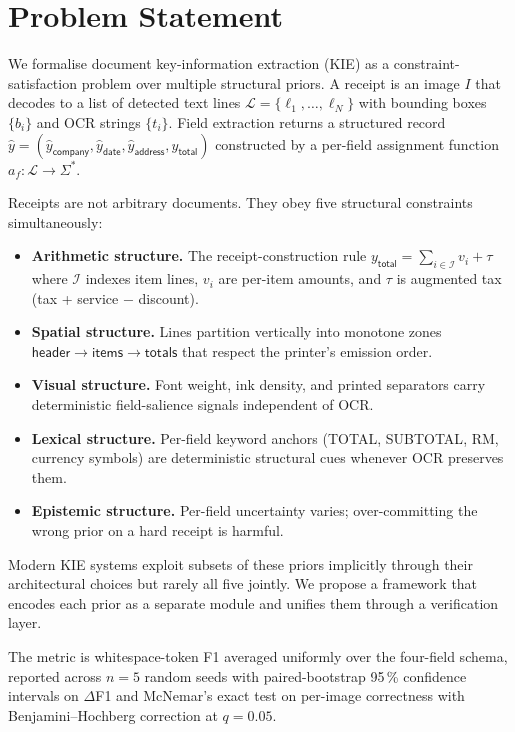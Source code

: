 \section{Problem Statement}
\label{sec:problem}

We formalise document key-information extraction (KIE) as a
constraint-satisfaction problem over multiple structural priors.
A receipt is an image $I$ that decodes to a list of detected text
lines $\mathcal{L} = \{\ell_1, \dots, \ell_N\}$ with bounding boxes
$\{b_i\}$ and OCR strings $\{t_i\}$.  Field extraction returns a
structured record
$\hat{y} = (\hat{y}_{\textsf{company}}, \hat{y}_{\textsf{date}},
\hat{y}_{\textsf{address}}, \hat{y}_{\textsf{total}})$
constructed by a per-field assignment function
$a_f: \mathcal{L} \to \Sigma^*$.

Receipts are not arbitrary documents.  They obey five structural
constraints simultaneously:

\begin{itemize}
\item \textbf{Arithmetic structure.}  The receipt-construction rule
      $y_{\textsf{total}} = \sum_{i \in \mathcal{I}} v_i + \tau$
      where $\mathcal{I}$ indexes item lines, $v_i$ are per-item
      amounts, and $\tau$ is augmented tax (tax + service
      $-$ discount).
\item \textbf{Spatial structure.}  Lines partition vertically into
      monotone zones $\textsf{header} \to \textsf{items} \to
      \textsf{totals}$ that respect the printer's emission order.
\item \textbf{Visual structure.}  Font weight, ink density, and
      printed separators carry deterministic field-salience signals
      independent of OCR.
\item \textbf{Lexical structure.}  Per-field keyword anchors
      (\textsf{TOTAL}, \textsf{SUBTOTAL}, \textsf{RM}, currency
      symbols) are deterministic structural cues whenever OCR
      preserves them.
\item \textbf{Epistemic structure.}  Per-field uncertainty varies;
      over-committing the wrong prior on a hard receipt is harmful.
\end{itemize}

Modern KIE systems exploit subsets of these priors implicitly
through their architectural choices but rarely all five jointly.
We propose a framework that encodes each prior as a separate
module and unifies them through a verification layer.

The metric is whitespace-token F1 averaged uniformly over the
four-field schema, reported across $n=5$ random seeds with
paired-bootstrap 95\,\% confidence intervals on $\Delta$F1 and
McNemar's exact test on per-image correctness with
Benjamini--Hochberg correction at $q=0.05$.
